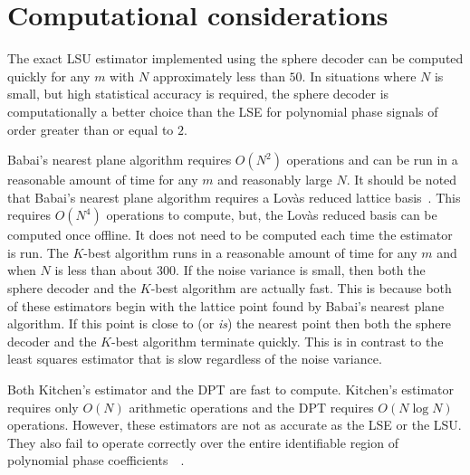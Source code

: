 \documentclass[journal]{IEEEtran}
\begin{document}


\section{Computational considerations}

The exact LSU estimator implemented using the sphere decoder can be computed quickly for any $m$ with $N$ approximately less than $50$.  In situations where $N$ is small, but high statistical accuracy is required, the sphere decoder is computationally a better choice than the LSE for polynomial phase signals of order greater than or equal to $2$. 

Babai's nearest plane algorithm requires $O(N^2)$ operations and can be run in a reasonable amount of time for any $m$ and reasonably large $N$. It should be noted that Babai's nearest plane algorithm requires a Lov\`as reduced lattice basis~\cite{Lenstra1982}.  This requires $O(N^4)$ operations to compute, but, the Lov\`as reduced basis can be computed once offline. It does not need to be computed each time the estimator is run. The $K$-best algorithm runs in a reasonable amount of time for any $m$ and when $N$ is less than about $300$. If the noise variance is small, then both the sphere decoder and the $K$-best algorithm are actually fast.  This is because both of these estimators begin with the lattice point found by Babai's nearest plane algorithm.  If this point is close to (or \emph{is}) the nearest point then both the sphere decoder and the $K$-best algorithm terminate quickly.  This is in contrast to the least squares estimator that is slow regardless of the noise variance. 

Both Kitchen's estimator and the DPT are fast to compute.  Kitchen's estimator requires only $O(N)$ arithmetic operations and the DPT requires $O(N \log N)$ operations.  However, these estimators are not as accurate as the LSE or the LSU.  They also fail to operate correctly over the entire identifiable region of polynomial phase coefficients~\cite{McKilliam2009IndentifiabliltyAliasingPolyphase}~\cite[Ch.~10]{McKilliam2010thesis}.



 
\end{document}
